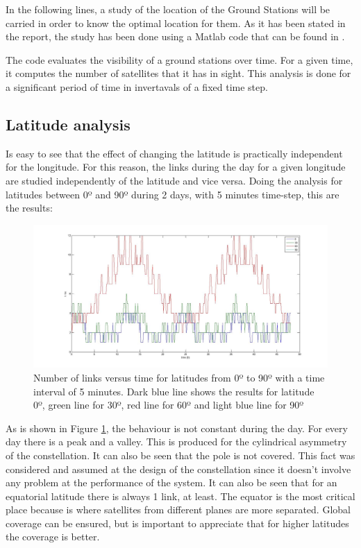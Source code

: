 In the following lines, a study of the location of the Ground Stations will be carried in order to know the optimal location for them. As it has been stated in the report, the study has been done using a Matlab code that can be found in \cite[Chanel 1, Section 12]{annex6}.

The code evaluates the visibility of a ground stations over time. For a given time, it computes the number of satellites that it has in sight. This analysis is done for a significant period of time in invertavals of a fixed time step.

\subsection{Latitude analysis}
Is easy to see that the effect of changing the latitude is practically independent for the longitude. For this reason, the links during the day for a given longitude are studied independently of the latitude and vice versa. Doing the analysis for latitudes between 0º and 90º during 2 days, with 5 minutes time-step, this are the results:
\begin{figure}[H]
\begin{center}
\includegraphics[scale=0.30]{0_30_90_lat.jpg}
\caption[Links vs time for latitudes from 0º to 90º]{Number of links versus time for latitudes from 0º to 90º with a time interval of 5 minutes. Dark blue line shows the results for latitude 0º, green line for 30º, red line for 60º and light blue line for 90º}
\label{fig:lat1}
\end{center}
\end{figure}
As is shown in Figure \ref{fig:lat1}, the behaviour is not constant during the day. For every day there is a peak and a valley. This is produced for the cylindrical asymmetry of the constellation. It can also be seen that the pole is not covered. This fact was considered and assumed at the design of the constellation since it doesn't involve any problem at the performance of the system. It can also be seen that for an equatorial latitude there is always 1 link, at least. The equator is the most critical place because is where satellites from different planes are more separated. Global coverage can be ensured, but is important to appreciate that for higher latitudes the coverage is better.

